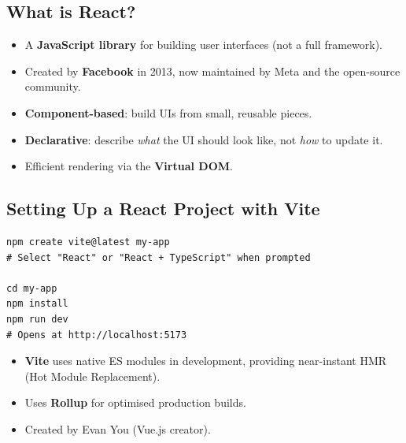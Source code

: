 \documentclass[hidelinks]{article}
\begin{document}
\subsection{What is React?}
\begin{itemize}
  \item A \textbf{JavaScript library} for building user interfaces (not a full framework).
  \item Created by \textbf{Facebook} in 2013, now maintained by Meta and the open-source community.
  \item \textbf{Component-based}: build UIs from small, reusable pieces.
  \item \textbf{Declarative}: describe \emph{what} the UI should look like, not \emph{how} to update it.
  \item Efficient rendering via the \textbf{Virtual DOM}.
\end{itemize}

\subsection{Setting Up a React Project with Vite}
\begin{lstlisting}[language={}, caption={Creating a React + Vite project}]
npm create vite@latest my-app
# Select "React" or "React + TypeScript" when prompted

cd my-app
npm install
npm run dev
# Opens at http://localhost:5173
\end{lstlisting}

\begin{itemize}
  \item \textbf{Vite} uses native ES modules in development, providing near-instant HMR (Hot Module Replacement).
  \item Uses \textbf{Rollup} for optimised production builds.
  \item Created by Evan You (Vue.js creator).
\end{itemize}
\end{document}
